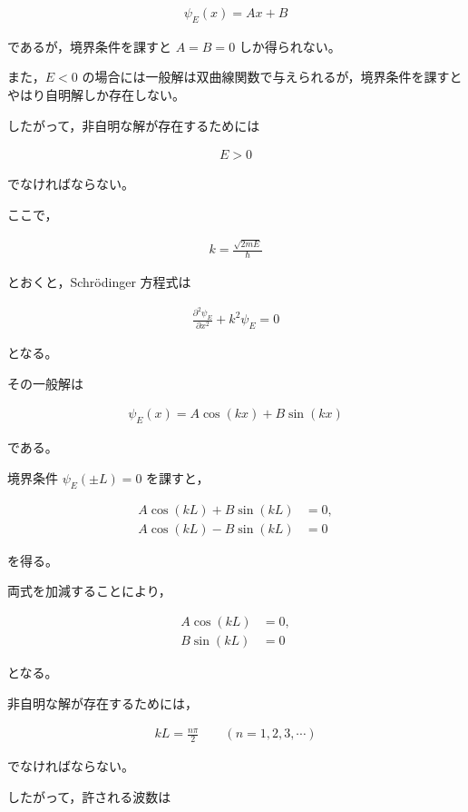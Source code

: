 \documentclass[platex,dvipdfmx,a4paper]{jsarticle}
\newcommand{\nhb}[3]{\frac{\partial^{#1} #2}{\partial #3^{#1}}}
\begin{document}
\begin{align*}
\psi_E(x)=Ax+B
\end{align*}

であるが，境界条件を課すと $A=B=0$ しか得られない。

また，$E<0$ の場合には一般解は双曲線関数で与えられるが，境界条件を課すとやはり自明解しか存在しない。

したがって，非自明な解が存在するためには

\begin{align*}
E>0
\end{align*}

でなければならない。

ここで，

\begin{align*}
k=\frac{\sqrt{2mE}}{\hbar}
\end{align*}

とおくと，Schr\"odinger 方程式は

\begin{align*}
\nhb{2}{\psi_E}{x}+k^2\psi_E=0
\end{align*}

となる。

その一般解は

\begin{align*}
\psi_E(x)
=
A\cos(kx)
+
B\sin(kx)
\end{align*}

である。

境界条件 $\psi_E(\pm L)=0$ を課すと，

\begin{align*}
A\cos(kL)+B\sin(kL)&=0,\\
A\cos(kL)-B\sin(kL)&=0
\end{align*}

を得る。

両式を加減することにより，

\begin{align*}
A\cos(kL)&=0,\\
B\sin(kL)&=0
\end{align*}

となる。

非自明な解が存在するためには，

\begin{align*}
kL=\frac{n\pi}{2}
\qquad
(n=1,2,3,\cdots)
\end{align*}

でなければならない。

したがって，許される波数は
\end{document}

